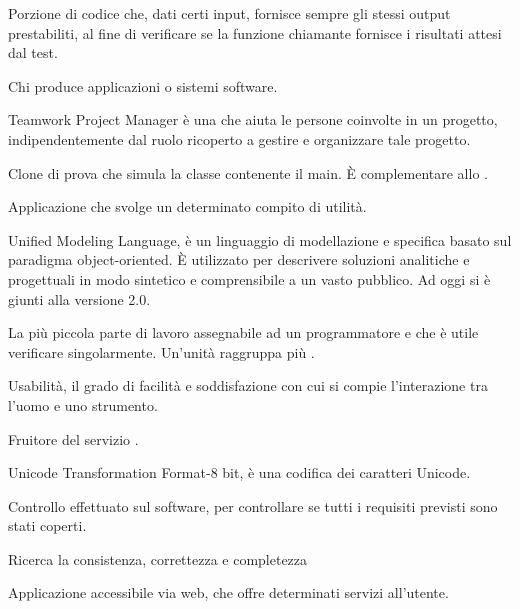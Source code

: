 Porzione di codice che, dati certi input, fornisce sempre gli stessi output prestabiliti, al fine di verificare se la funzione chiamante fornisce i risultati attesi dal test.

Chi produce applicazioni o sistemi software.


Teamwork Project Manager è una  che aiuta le persone coinvolte in un progetto, indipendentemente dal ruolo ricoperto a gestire e organizzare tale progetto.

Clone di prova che simula la classe contenente il main. È complementare allo .

Applicazione che svolge un determinato compito di utilità.


Unified Modeling Language, è un linguaggio di modellazione e specifica basato sul paradigma object-oriented. 
È utilizzato per descrivere soluzioni analitiche e progettuali in modo sintetico e comprensibile a un vasto pubblico.
Ad oggi si è giunti alla versione 2.0.

La più piccola parte di lavoro assegnabile ad un programmatore e che è utile verificare singolarmente. Un'unità raggruppa più .

Usabilità, il grado di facilità e soddisfazione con cui si compie l'interazione tra l'uomo e uno strumento.

Fruitore del servizio \ProjectName{}.

Unicode Transformation Format-8 bit, è una codifica dei caratteri Unicode. 


Controllo effettuato sul software, per controllare se tutti i requisiti previsti sono stati coperti.

Ricerca la consistenza, correttezza e completezza


Applicazione accessibile via web, che offre determinati servizi all'utente.

%


